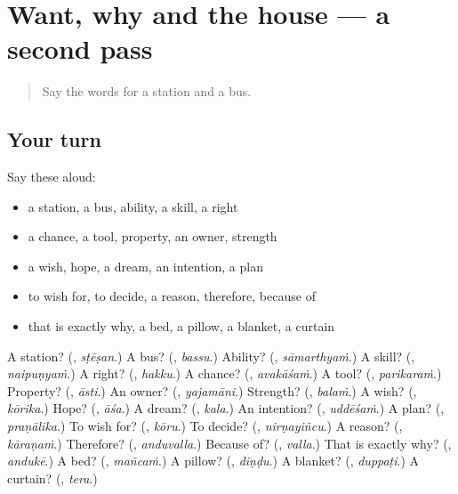 \section[(dialogue)]{Want, why and the house — a second pass}

\label{lesson:TE-R109-second-pass-want-why-and-the-house}



\begin{quote}
Say the words for a station and a bus.
\end{quote}

\subsection*{Your turn}
Say these aloud:

\begin{itemize}
\raggedright
  \item a station, a bus, ability, a skill, a right
  \item a chance, a tool, property, an owner, strength
  \item a wish, hope, a dream, an intention, a plan
  \item to wish for, to decide, a reason, therefore, because of
  \item that is exactly why, a bed, a pillow, a blanket, a curtain
\end{itemize}

\begin{tcolorbox}[breakable,colback=teal!4,colframe=teal!35!black,title={Before you move on}]
A station? (\textbf{}, \emph{sṭēṣan}.) A bus? (\textbf{}, \emph{bassu}.) Ability? (\textbf{}, \emph{sāmarthyaṁ}.) A skill? (\textbf{}, \emph{naipuṇyaṁ}.) A right? (\textbf{}, \emph{hakku}.) A chance? (\textbf{}, \emph{avakāśaṁ}.) A tool? (\textbf{}, \emph{parikaraṁ}.) Property? (\textbf{}, \emph{āsti}.) An owner? (\textbf{}, \emph{yajamāni}.) Strength? (\textbf{}, \emph{balaṁ}.) A wish? (\textbf{}, \emph{kōrika}.) Hope? (\textbf{}, \emph{āśa}.) A dream? (\textbf{}, \emph{kala}.) An intention? (\textbf{}, \emph{uddēśaṁ}.) A plan? (\textbf{}, \emph{praṇālika}.) To wish for? (\textbf{}, \emph{kōru}.) To decide? (\textbf{}, \emph{nirṇayiñcu}.) A reason? (\textbf{}, \emph{kāraṇaṁ}.) Therefore? (\textbf{}, \emph{anduvalla}.) Because of? (\textbf{}, \emph{valla}.) That is exactly why? (\textbf{}, \emph{andukē}.) A bed? (\textbf{}, \emph{mañcaṁ}.) A pillow? (\textbf{}, \emph{diṇḍu}.) A blanket? (\textbf{}, \emph{duppaṭi}.) A curtain? (\textbf{}, \emph{tera}.)
\end{tcolorbox}
